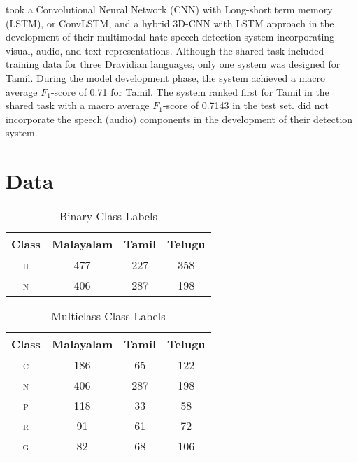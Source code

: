 \documentclass[11pt]{article}
\begin{document}
    \citet{rahman_binary_beastsdravidianlangtech-eacl_2024} took a Convolutional Neural Network (CNN) with Long-short term memory (LSTM), or ConvLSTM, and a hybrid 3D-CNN with LSTM approach in the development of their multimodal hate speech detection system incorporating visual, audio, and text representations. Although the shared task included training data for three Dravidian languages, only one system was designed for Tamil. During the model development phase, the system achieved a macro average $F_1$-score of 0.71 for Tamil. The system ranked first for Tamil in the shared task with a macro average $F_1$-score of 0.7143 in the test set. \citet{s_wit_2024} did not incorporate the speech (audio) components in the development of their detection system.

\section{Data} 
\label{sec:data}

    \begin{table}
        \caption{\label{tab:train_binary} Binary Class Labels}
        \centering
        \begin{tabular}{cccc}
            \hline
            Class & Malayalam & Tamil & Telugu \\
            \hline
            \textsc{h} & 477 & 227 & 358 \\
            \textsc{n} & 406 & 287 & 198 \\
            \hline
         \end{tabular}
     \end{table}

    \begin{table}
        \caption{\label{tab:train_multiclass} Multiclass Class Labels}
        \centering
        \begin{tabular}{cccc}
            \hline
            Class & Malayalam & Tamil & Telugu \\
            \hline
            \textsc{c} & 186 & 65 & 122 \\
            \textsc{n} & 406 & 287 & 198 \\
            \textsc{p} & 118 & 33 & 58 \\
            \textsc{r} & 91 & 61 & 72 \\
            \textsc{g} & 82 & 68 & 106 \\
            \hline
         \end{tabular}
     \end{table}
\end{document}
